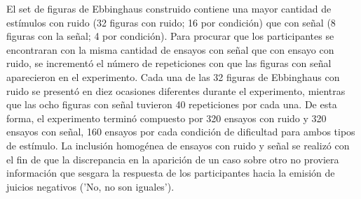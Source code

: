 \begin{itemize}
El set de figuras de Ebbinghaus construido contiene una mayor cantidad de estímulos con ruido (32 figuras con ruido; 16 por condición) que con señal (8 figuras con la señal; 4 por condición). Para procurar que los participantes se encontraran con la misma cantidad de ensayos con señal que con ensayo con ruido, se incrementó el número de repeticiones con que las figuras con señal aparecieron en el experimento. Cada una de las 32 figuras de Ebbinghaus con ruido se presentó en diez ocasiones diferentes durante el experimento, mientras que las ocho figuras con señal tuvieron 40 repeticiones por cada una. De esta forma, el experimento terminó compuesto por 320 ensayos con ruido y 320 ensayos con señal, 160 ensayos por cada condición de dificultad para ambos tipos de estímulo. La inclusión homogénea de ensayos con ruido y señal se realizó con el fin de que la discrepancia en la aparición de un caso sobre otro no proviera información que sesgara la respuesta de los participantes hacia la emisión de juicios negativos ('No, no son iguales').\\


\end{itemize}
